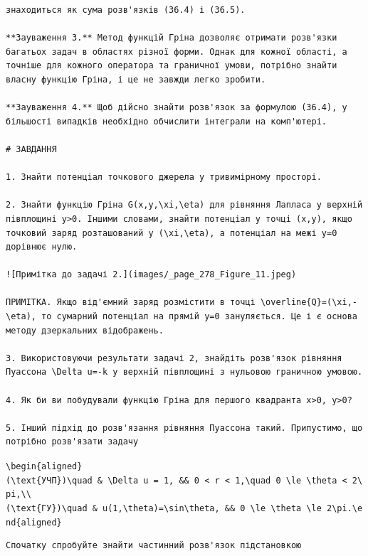 \documentclass[
  ukrainian,
]{article}
\begin{document}
\begin{verbatim}
знаходиться як сума розв'язків (36.4) і (36.5).

**Зауваження 3.** Метод функцій Гріна дозволяє отримати розв'язки багатьох задач в областях різної форми. Однак для кожної області, а точніше для кожного оператора та граничної умови, потрібно знайти власну функцію Гріна, і це не завжди легко зробити.

**Зауваження 4.** Щоб дійсно знайти розв'язок за формулою (36.4), у більшості випадків необхідно обчислити інтеграли на комп'ютері.

# ЗАВДАННЯ

1. Знайти потенціал точкового джерела у тривимірному просторі.

2. Знайти функцію Гріна G(x,y,\xi,\eta) для рівняння Лапласа у верхній півплощині y>0. Іншими словами, знайти потенціал у точці (x,y), якщо точковий заряд розташований у (\xi,\eta), а потенціал на межі y=0 дорівнює нулю.

![Примітка до задачі 2.](images/_page_278_Figure_11.jpeg)

ПРИМІТКА. Якщо від'ємний заряд розмістити в точці \overline{Q}=(\xi,-\eta), то сумарний потенціал на прямій y=0 зануляється. Це і є основа методу дзеркальних відображень.

3. Використовуючи результати задачі 2, знайдіть розв'язок рівняння Пуассона \Delta u=-k у верхній півплощині з нульовою граничною умовою.

4. Як би ви побудували функцію Гріна для першого квадранта x>0, y>0?

5. Інший підхід до розв'язання рівняння Пуассона такий. Припустимо, що потрібно розв'язати задачу
\end{verbatim}

\texttt{\textbackslash{}begin\{aligned\}(\textbackslash{}text\{УЧП\})\textbackslash{}quad\ \&\ \textbackslash{}Delta\ u\ =\ 1,\ \&\&\ 0\ \textless{}\ r\ \textless{}\ 1,\textbackslash{}quad\ 0\ \textbackslash{}le\ \textbackslash{}theta\ \textless{}\ 2\textbackslash{}pi,\textbackslash{}\textbackslash{}(\textbackslash{}text\{ГУ\})\textbackslash{}quad\ \&\ u(1,\textbackslash{}theta)=\textbackslash{}sin\textbackslash{}theta,\ \&\&\ 0\ \textbackslash{}le\ \textbackslash{}theta\ \textbackslash{}le\ 2\textbackslash{}pi.\textbackslash{}end\{aligned\}}

\begin{verbatim}
Спочатку спробуйте знайти частинний розв'язок підстановкою
\end{verbatim}
\end{document}
